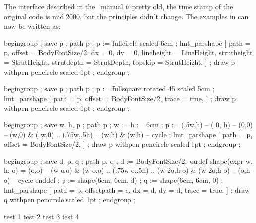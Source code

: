 The interface described in the \METAFUN\ manual is pretty old, the time stamp of
the original code is mid 2000, but the principles didn't change. The examples in
 can now be written as:

  begingroup ;
    save p ; path p ; p := fullcircle scaled 6cm ;
    lmt_parshape [
        path        = p,
        offset      = BodyFontSize/2,
        dx          = 0,           %
        dy          = 0,           %
        lineheight  = LineHeight,  %
        strutheight = StrutHeight, %
        strutdepth  = StrutDepth,  %
        topskip     = StrutHeight, %
    ] ;
    draw p withpen pencircle scaled 1pt ;
  endgroup ;
\stopuseMPgraphic

  begingroup ;
    save p ; path p ; p := fullsquare rotated 45 scaled 5cm ;
    lmt_parshape [
        path   = p,
        offset = BodyFontSize/2,
        trace  = true,
    ] ;
    draw p withpen pencircle scaled 1pt ;
  endgroup ;
\stopuseMPgraphic

  begingroup ;
    save w, h, p ; path p ; w := h := 6cm ;
    p := (.5w,h) -- (   0,  h) -- (0,0) -- (w,0) &
         (  w,0) .. (.75w,.5h) .. (w,h) &  (w,h) -- cycle ;
    lmt_parshape [
        path   = p,
        offset = BodyFontSize/2,
    ] ;
    draw p withpen pencircle scaled 1pt ;
  endgroup ;
\stopuseMPgraphic

  begingroup ;
    save d, p, q ; path p, q ; d := BodyFontSize/2;
    vardef shape(expr w, h, o) =
        (o,o) -- (w-o,o) & (w-o,o) .. (.75w-o,.5h) ..
        (w-2o,h-o) & (w-2o,h-o) -- (o,h-o) -- cycle
    enddef ;
    p := shape(6cm, 6cm, d) ; q := shape(6cm, 6cm, 0) ;
    lmt_parshape [
        path       = p,
        offsetpath = q,
        dx         = d,
        dy         = d,
        trace      = true,
    ] ;
    draw q withpen pencircle scaled 1pt ;
  endgroup ;
\stopuseMPgraphic


\startbuffer
  \stopshapetext
  \startcombination[2*2]
    {\framed[offset=overlay,frame=off,background=test 1]{\getshapetext}}
        {test 1}
    {\framed[offset=overlay,frame=off,background=test 2]{\getshapetext}}
        {test 2}
    {\framed[offset=overlay,frame=off,background=test 3]{\getshapetext}}
        {test 3}
    {\framed[offset=overlay,frame=off,background=test 4]{\getshapetext}}
        {test 4}
  \stopcombination
\stopbuffer

